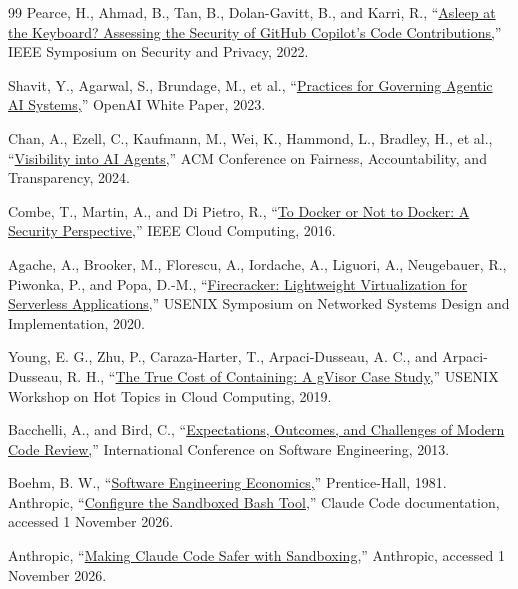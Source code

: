 \documentclass[12pt,a4paper,oneside]{report}
\begin{document}
\begin{thebibliography}{99}
 Pearce, H., Ahmad, B., Tan, B., Dolan-Gavitt, B., and Karri, R., ``\href{https://doi.org/10.1109/SP46214.2022.9833571}{Asleep at the Keyboard? Assessing the Security of GitHub Copilot's Code Contributions,}'' IEEE Symposium on Security and Privacy, 2022.

 Shavit, Y., Agarwal, S., Brundage, M., et al., ``\href{https://openai.com/index/practices-for-governing-agentic-ai-systems/}{Practices for Governing Agentic AI Systems,}'' OpenAI White Paper, 2023.

 Chan, A., Ezell, C., Kaufmann, M., Wei, K., Hammond, L., Bradley, H., et al., ``\href{https://doi.org/10.1145/3630106.3658948}{Visibility into AI Agents,}'' ACM Conference on Fairness, Accountability, and Transparency, 2024.

 Combe, T., Martin, A., and Di Pietro, R., ``\href{https://doi.org/10.1109/MCC.2016.100}{To Docker or Not to Docker: A Security Perspective,}'' IEEE Cloud Computing, 2016.

 Agache, A., Brooker, M., Florescu, A., Iordache, A., Liguori, A., Neugebauer, R., Piwonka, P., and Popa, D.-M., ``\href{https://www.usenix.org/conference/nsdi20/presentation/agache}{Firecracker: Lightweight Virtualization for Serverless Applications,}'' USENIX Symposium on Networked Systems Design and Implementation, 2020.

 Young, E. G., Zhu, P., Caraza-Harter, T., Arpaci-Dusseau, A. C., and Arpaci-Dusseau, R. H., ``\href{https://www.usenix.org/conference/hotcloud19/presentation/young}{The True Cost of Containing: A gVisor Case Study,}'' USENIX Workshop on Hot Topics in Cloud Computing, 2019.

 Bacchelli, A., and Bird, C., ``\href{https://doi.org/10.1109/ICSE.2013.6606617}{Expectations, Outcomes, and Challenges of Modern Code Review,}'' International Conference on Software Engineering, 2013.

 Boehm, B. W., ``\href{https://www.pearson.com/en-us/subject-catalog/p/software-engineering-economics/P200000000306}{Software Engineering Economics,}'' Prentice-Hall, 1981.
 Anthropic, ``\href{https://code.claude.com/docs/en/sandboxing}{Configure the Sandboxed Bash Tool,}'' Claude Code documentation, accessed 1 November 2026.

 Anthropic, ``\href{https://www.anthropic.com/research/claude-code-sandboxing}{Making Claude Code Safer with Sandboxing,}'' Anthropic, accessed 1 November 2026.


\end{thebibliography}
\end{document}
